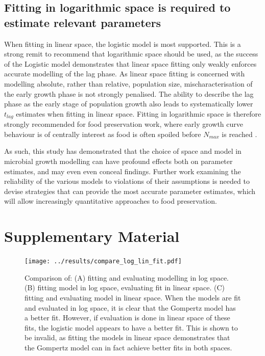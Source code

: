 \documentclass[11pt, a4paper]{article}
\newcommand{\beginsupplement}{%
        \setcounter{table}{0}
        \renewcommand{\thetable}{S\arabic{table}}%
        \setcounter{figure}{0}
        \renewcommand{\thefigure}{S\arabic{figure}}%
     }
\begin{document}
\begin{linenumbers}
\subsection{Fitting in logarithmic space is required to estimate relevant parameters}
When fitting in linear space, the logistic model is most supported. This is a strong remit to recommend that logarithmic space should be used, as the success of the Logistic model demonstrates that linear space fitting only weakly enforces accurate modelling of the lag phase. As linear space fitting is concerned with modelling absolute, rather than relative, population size, mischaracterisation of the early growth phase is not strongly penalised. The ability to describe the lag phase as the early stage of population growth also leads to systematically lower $t_{lag}$ estimates when fitting in linear space. Fitting in logarithmic space is therefore strongly recommended for food preservation work, where early growth curve behaviour is of centrally interest as food is often spoiled before $N_{max}$ is reached \cite{MicrobialGrowth}.

As such, this study has demonstrated that the choice of space and model in microbial growth modelling can have profound effects both on parameter estimates, and may even even conceal findings. Further work examining the reliability of the various models to violations of their assumptions is needed to devise strategies that can provide the most accurate parameter estimates, which will allow increasingly quantitative approaches to food preservation.


\end{linenumbers}

\section{Supplementary Material}
\beginsupplement

        \begin{figure}[H]
        \texttt{[image: ../results/compare\_log\_lin\_fit.pdf]}
        \captionsetup{format=hang}
        \caption{Comparison of: (A) fitting and evaluating modelling in log space. (B) fitting model in log space, evaluating fit in linear space. (C) fitting and evaluating model in linear space. \newline When the models are fit and evaluated in log space, it is clear that the Gompertz model has a better fit. However, if evaluation is done in linear space of these fits, the logistic model appears to have a better fit. This is shown to be invalid, as fitting the models in linear space demonstrates that the Gompertz model can in fact achieve better fits in both spaces.  }
        \label{sup:compare_least_squares}
        \end{figure}
        
\end{document}

